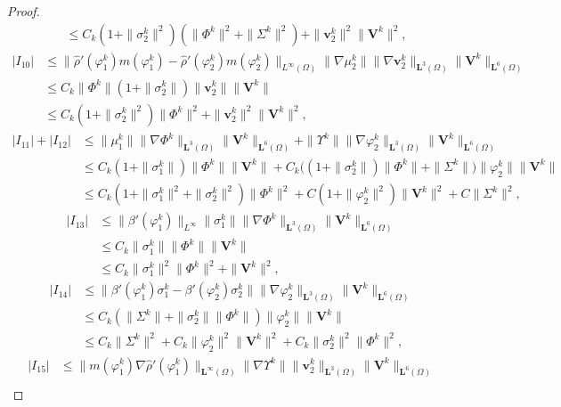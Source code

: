\documentclass[11pt,reqno]{amsart}
\def\vv{\bm{v}}
\begin{document}
\begin{proof}
\begin{align*}
&\leq C_k(1+\| \sigma^k_2\|^2) (\| \Phi^k\|^2 + \| \Sigma^k\|^2)
+ \|\bm{v}^k_2\|^2 \|\bm{V}^k\|^2,
\end{align*}
%
\begin{align*}
|I_{10}|&\leq \|\widehat{\rho}'(\varphi_1^k) m(\varphi_1^k) -\widehat{\rho}'(\varphi_2^k) m(\varphi_2^k)\|_{L^\infty(\Omega)} \|\nabla \mu_2^k\| \| \nabla \vv_2^k\|_{\bm{L}^3(\Omega)} \|\bm{V}^k\|_{\bm{L}^6(\Omega)}
\\
&\leq C_k \|\Phi^k\|(1+\|\sigma_2^k\|) \|\bm{v}^k_2\| \|\bm{V}^k\|
\\
&\leq C_k(1+\| \sigma^k_2\|^2) \| \Phi^k\|^2
+ \|\bm{v}^k_2\|^2 \|\bm{V}^k\|^2,
\end{align*}
%
\begin{align*}
|I_{11}| + |I_{12}|
&\leq  \|\mu_1^k\|\|\nabla \Phi^k\|_{\bm{L}^3(\Omega)} \|\bm{V}^k\|_{\bm{L}^6(\Omega)}
+ \|\Upsilon^k\| \| \nabla \varphi_2^k\|_{\bm{L}^3(\Omega)} \| \bm{V}^k\|_{\bm{L}^6(\Omega)}
\\
&\leq C_k(1+\|\sigma_1^k\|) \|\Phi^k\| \|\bm{V}^k\|
+ C_k \big((1+\| \sigma^k_2\|) \| \Phi^k\|
+ \|\Sigma^k\|\big) \|\varphi_2^k\| \| \bm{V}^k\|
\\
&\leq  C_k(1+\| \sigma^k_1\|^2 + \| \sigma^k_2\|^2)
\| \Phi^k\|^2 + C(1+\|\varphi^k_2\|^2) \|\bm{V}^k\|^2
+ C \|\Sigma^k\|^2,
\end{align*}
%
\begin{align*}
|I_{13}|
&\leq \|\beta'(\varphi_1^k)\|_{L^\infty}\|\sigma_1^k\|\|\nabla \Phi^k\|_{\bm{L}^3(\Omega)} \| \bm{V}^k\|_{\bm{L}^6(\Omega)}
\\
&\leq C_k\|\sigma_1^k\|\|\Phi^k\|\| \bm{V}^k\|
\\
&\leq C_k\|\sigma_1^k\|^2 \|\Phi^k\|^2
+ \| \bm{V}^k\|^2,
\end{align*}
%
\begin{align*}
|I_{14}|
&\leq \|\beta'(\varphi_1^k)\sigma_1^k-\beta'(\varphi_2^k)\sigma_2^k\|
\|\nabla \varphi^k_2\|_{\bm{L}^3(\Omega)} \|\bm{V}^k\|_{\bm{L}^6(\Omega)}
\\
&\leq C_k(\|\Sigma^k\| +\|\sigma_2^k\|\|\Phi^k\|) \|\varphi_2^k\|\|\bm{V}^k\|
\\
&\leq C_k\|\Sigma^k\|^2 + C_k\|\varphi_2^k\|^2\|\bm{V}^k\|^2
+ C_k\|\sigma_2^k\|^2\|\Phi^k\|^2,
\end{align*}
%
\begin{align*}
|I_{15}|
&\leq \|m(\varphi^k_1)\nabla \widehat{\rho}'(\varphi^k_1)\|_{\bm{L}^\infty(\Omega)}
\| \nabla \Upsilon^k\| \| \vv^k_2\|_{\bm{L}^3(\Omega)} \|\bm{V}^k\|_{\bm{L}^6(\Omega)}
\\

\end{align*}
\end{proof}
\end{document}
